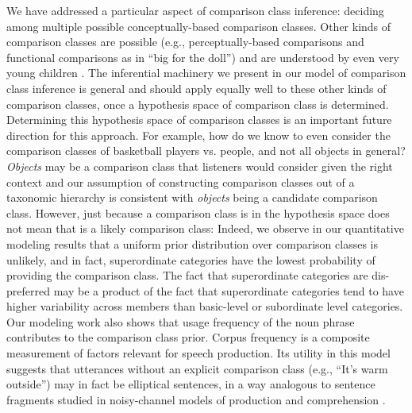 \documentclass[doc, floatsintext]{apa6}
\begin{document}

We have addressed a particular aspect of comparison class inference: deciding among multiple possible conceptually-based comparison classes.
Other kinds of comparison classes are possible (e.g., perceptually-based comparisons and functional comparisons as in ``big for the doll'') and are understood by even very young children \cite{Ebeling1994}.
The inferential machinery we present in our model of comparison class inference is general and should apply equally well to these other kinds of comparison classes, once a hypothesis space of comparison class is determined.
Determining this hypothesis space of comparison classes is an important future direction for this approach.
For example, how do we know to even consider the comparison classes of basketball players vs. people, and not all objects in general?
\emph{Objects} may be a comparison class that listeners would consider given the right context and our assumption of constructing comparison classes out of a taxonomic hierarchy is consistent with \emph{objects} being a candidate comparison class.
However, just because a comparison class is in the hypothesis space does not mean that is a likely comparison class: Indeed, we observe in our quantitative modeling results that a uniform prior distribution over comparison classes is unlikely, and in fact, superordinate categories have the lowest probability of providing the comparison class.
The fact that superordinate categories are dis-preferred may be a product of the fact that superordinate categories tend to have higher variability across members than basic-level or subordinate level categories.
Our modeling work also shows that usage frequency of the noun phrase contributes to the comparison class prior.
Corpus frequency is a composite measurement of factors relevant for speech production.
Its utility in this model suggests that utterances without an explicit comparison class (e.g., ``It's warm outside'') may in fact be elliptical sentences, in a way analogous to sentence fragments studied in noisy-channel models of production and comprehension \cite{bergen2015strategic}.
\end{document}
